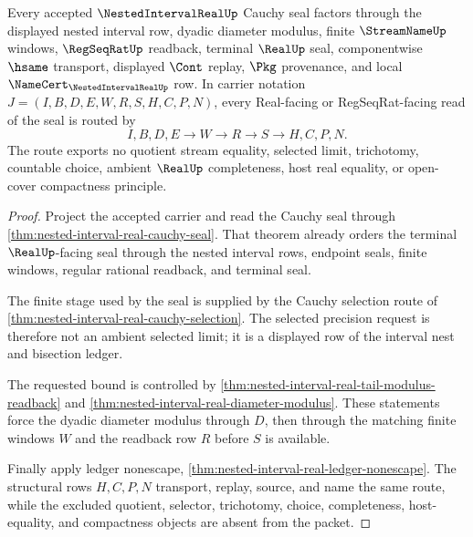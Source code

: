 \begin{theorem}
\label{thm:nested-interval-real-scoped-kernel-route}
Every accepted $\NestedIntervalRealUp$ Cauchy seal factors through the displayed nested interval row, dyadic diameter modulus, finite $\StreamNameUp$ windows, $\RegSeqRatUp$ readback, terminal $\RealUp$ seal, componentwise $\hsame$ transport, displayed $\Cont$ replay, $\Pkg$ provenance, and local $\NameCert_{\NestedIntervalRealUp}$ row. In carrier notation $J=(I,B,D,E,W,R,S,H,C,P,N)$, every Real-facing or RegSeqRat-facing read of the seal is routed by
$$
I,B,D,E \longrightarrow W \longrightarrow R \longrightarrow S \longrightarrow H,C,P,N .
$$
The route exports no quotient stream equality, selected limit, trichotomy, countable choice, ambient $\RealUp$ completeness, host real equality, or open-cover compactness principle.
\end{theorem}
\begin{proof}
Project the accepted carrier and read the Cauchy seal through \autoref{thm:nested-interval-real-cauchy-seal}. That theorem already orders the terminal $\RealUp$-facing seal through the nested interval rows, endpoint seals, finite windows, regular rational readback, and terminal seal.

The finite stage used by the seal is supplied by the Cauchy selection route of \autoref{thm:nested-interval-real-cauchy-selection}. The selected precision request is therefore not an ambient selected limit; it is a displayed row of the interval nest and bisection ledger.

The requested bound is controlled by \autoref{thm:nested-interval-real-tail-modulus-readback} and \autoref{thm:nested-interval-real-diameter-modulus}. These statements force the dyadic diameter modulus through $D$, then through the matching finite windows $W$ and the readback row $R$ before $S$ is available.

Finally apply ledger nonescape, \autoref{thm:nested-interval-real-ledger-nonescape}. The structural rows $H,C,P,N$ transport, replay, source, and name the same route, while the excluded quotient, selector, trichotomy, choice, completeness, host-equality, and compactness objects are absent from the packet.
\end{proof}

